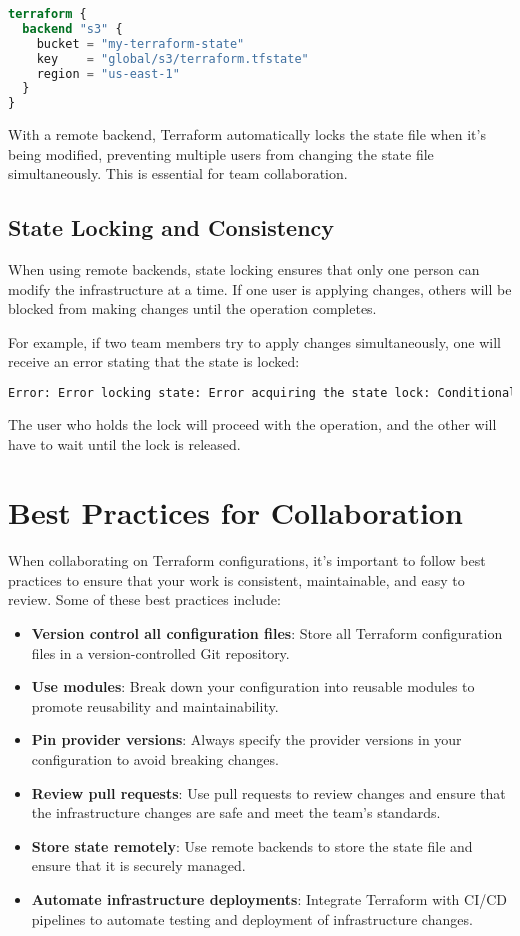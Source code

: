 \begin{lstlisting}[language=terraform]
terraform {
  backend "s3" {
    bucket = "my-terraform-state"
    key    = "global/s3/terraform.tfstate"
    region = "us-east-1"
  }
}
\end{lstlisting}

With a remote backend, Terraform automatically locks the state file when it's being modified, preventing multiple users from changing the state file simultaneously. This is essential for team collaboration.

\subsection{State Locking and Consistency}

When using remote backends, state locking ensures that only one person can modify the infrastructure at a time. If one user is applying changes, others will be blocked from making changes until the operation completes.

For example, if two team members try to apply changes simultaneously, one will receive an error stating that the state is locked:

\begin{lstlisting}[language=bash]
Error: Error locking state: Error acquiring the state lock: ConditionalCheckFailedException: The conditional request failed
\end{lstlisting}

The user who holds the lock will proceed with the operation, and the other will have to wait until the lock is released.

\section{Best Practices for Collaboration}

When collaborating on Terraform configurations, it's important to follow best practices to ensure that your work is consistent, maintainable, and easy to review. Some of these best practices include:

\begin{itemize}
  \item \textbf{Version control all configuration files}: Store all Terraform configuration files in a version-controlled Git repository.
  \item \textbf{Use modules}: Break down your configuration into reusable modules to promote reusability and maintainability.
  \item \textbf{Pin provider versions}: Always specify the provider versions in your configuration to avoid breaking changes.
  \item \textbf{Review pull requests}: Use pull requests to review changes and ensure that the infrastructure changes are safe and meet the team's standards.
  \item \textbf{Store state remotely}: Use remote backends to store the state file and ensure that it is securely managed.
  \item \textbf{Automate infrastructure deployments}: Integrate Terraform with CI/CD pipelines to automate testing and deployment of infrastructure changes.
\end{itemize}

